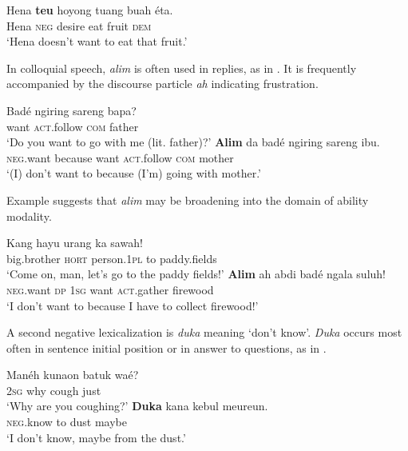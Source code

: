\documentclass[output=paper]{langscibook}
\begin{document}
\ea\label{ex:sun:29} 
    \gll  Hena \textbf{teu} hoyong tuang buah éta.\\ 
          Hena \textsc{neg} desire eat fruit \textsc{dem}\\
    \glt ‘Hena doesn’t want to eat that fruit.’ \citep[73]{Butters2021}
\z 

In colloquial speech, \textit{alim} is often used in replies, as in . It is frequently accompanied by the discourse particle \textit{ah} indicating frustration. 

\ea\label{ex:sun:30a}
    \begin{xlist}[Q: ]
    \label{ex:sun:30aQ}
        \gll  Badé ngiring sareng bapa?\\
            want \textsc{act}.follow \textsc{com} father\\
        \glt ‘Do you want to go with me (lit. father)?’
    \label{ex:sun:30aA}
        \gll  \textbf{Alim} da badé ngiring sareng ibu.\\
            \textsc{neg}.want because want \textsc{act}.follow \textsc{com} mother\\
        \glt ‘(I) don’t want to because (I’m) going with mother.’ \citep[74]{Butters2021}
    \end{xlist}
\z 

Example  suggests that \textit{alim} may be broadening into the domain of ability modality. 

\ea\label{ex:sun:30b}    
    \begin{xlist}[B: ]
    \label{ex:sun:30bA}
        \gll   Kang hayu urang ka sawah!\\
            big.brother \textsc{hort} person.1\textsc{pl} to paddy.fields\\
        \glt ‘Come on, man, let’s go to the paddy fields!’
    \label{ex:sun:30bB}
        \gll  \textbf{Alim} ah abdi badé ngala suluh! \\
            \textsc{neg}.want \textsc{dp} 1\textsc{sg} want \textsc{act}.gather firewood\\
        \glt ‘I don’t want to because I have to collect firewood!’ \citep[74]{Butters2021}
    \end{xlist}
\z

A second negative lexicalization is \textit{duka} meaning ‘{don't know}’. \textit{Duka} occurs most often in sentence initial position or in answer to questions, as in . 

 
\ea\label{ex:sun:31}
    \begin{xlist}
    \label{ex:sun:31A}
        \gll  Manéh kunaon batuk waé? \\ 
              2\textsc{sg} why cough just\\ 
        \glt ‘Why are you coughing?’
    \label{ex:sun:31B}
        \gll  \textbf{Duka} kana kebul meureun. \\ 
               \textsc{neg}.know to dust maybe\\
        \glt ‘I don’t know, maybe from the dust.’ \citep[82]{Butters2021}
    \end{xlist}
\z 
\end{document}
